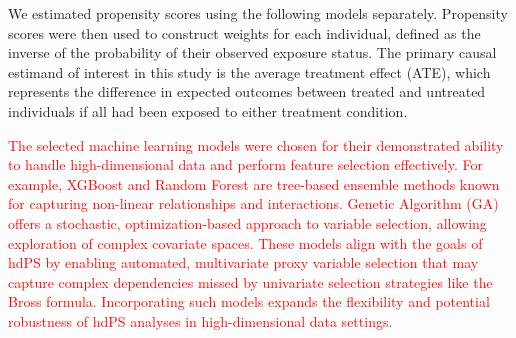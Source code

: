 \documentclass[10pt,letterpaper]{article}
\begin{document}
We estimated propensity scores using the following models separately.
Propensity scores were then used to construct weights for each
individual, defined as the inverse of the probability of their observed
exposure status. The primary causal estimand of interest in this study
is the average treatment effect (ATE), which represents the difference
in expected outcomes between treated and untreated individuals if all
had been exposed to either treatment condition.

\textcolor{red}{The selected machine learning models were chosen for their demonstrated ability to handle high-dimensional data and perform feature selection effectively. For example, XGBoost and Random Forest are tree-based ensemble methods known for capturing non-linear relationships and interactions. Genetic Algorithm (GA) offers a stochastic, optimization-based approach to variable selection, allowing exploration of complex covariate spaces. These models align with the goals of hdPS by enabling automated, multivariate proxy variable selection that may capture complex dependencies missed by univariate selection strategies like the Bross formula. Incorporating such models expands the flexibility and potential robustness of hdPS analyses in high-dimensional data settings.}
\end{document}
